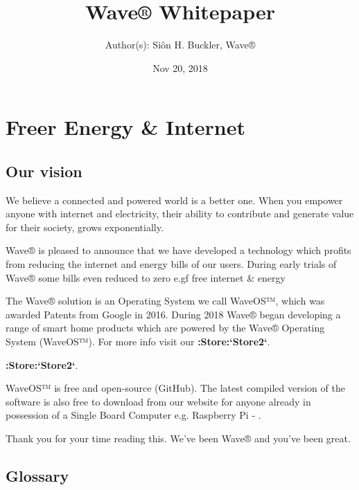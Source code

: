 \documentclass[letterpaper,10pt,english]{sphinxmanual}
\title{Wave® Whitepaper}
\date{Nov 20, 2018}
\author{Author(s): Siôn H. Buckler, Wave®}
\begin{document}
\pagestyle{empty}
\maketitle
\pagestyle{plain}
\sphinxtableofcontents
\pagestyle{normal}
\label{\detokenize{index::doc}}



\chapter{Freer Energy \& Internet}
\label{\detokenize{index:freer-energy-internet}}


\section{Our vision}
\label{\detokenize{index:our-vision}}
We believe a connected and powered world is a better one. When you empower anyone with internet and electricity, their ability to contribute and generate value for their society, grows exponentially.

Wave® is pleased to announce that we have developed a technology which profits from reducing the internet and energy bills of our users. During early trials of Wave® some bills even reduced to zero e.gf free internet \& energy

The Wave® solution is an Operating System we call WaveOS™, which was awarded Patents from Google in 2016. During 2018 Wave® began developing a range of smart home products which are powered by the Wave® Operating System (WaveOS™). For more info visit our {\color{red}\bfseries{}:Store:{}`Store2{}`}.

{\color{red}\bfseries{}:Store:{}`Store2{}`}.

WaveOS™ is free and open-source (GitHub). The latest compiled version of the software is also free to download from our website for anyone already in possession of a Single Board Computer e.g. Raspberry Pi - .

Thank you for your time reading this.
We’ve been Wave® and you’ve been great.


\section{Glossary}
\label{\detokenize{index:glossary}}
\end{document}
